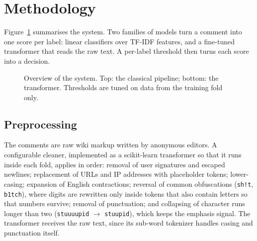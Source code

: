 \documentclass[11pt,a4paper]{article}
\begin{document}
\section{Methodology}

Figure~\ref{fig:pipeline} summarises the system.  Two families of models turn
a comment into one score per label: linear classifiers over TF-IDF features,
and a fine-tuned transformer that reads the raw text.  A per-label threshold
then turns each score into a decision.

\begin{figure}[H]
  \centering
  \caption{Overview of the system.  Top: the classical pipeline; bottom: the
    transformer.  Thresholds are tuned on data from the training fold only.}
  \label{fig:pipeline}
\end{figure}

\subsection{Preprocessing}

The comments are raw wiki markup written by anonymous editors.  A configurable
cleaner, implemented as a scikit-learn transformer so that it runs inside each
fold, applies in order: removal of user signatures and escaped newlines;
replacement of URLs and IP addresses with placeholder tokens; lower-casing;
expansion of English contractions; reversal of common obfuscations
(\texttt{sh!t}, \texttt{b1tch}), where digits are rewritten only inside tokens
that also contain letters so that numbers survive; removal of punctuation; and
collapsing of character runs longer than two (\texttt{stuuuupid} $\to$
\texttt{stuupid}), which keeps the emphasis signal.  The transformer receives
the raw text, since its sub-word tokenizer handles casing and punctuation
itself.
\end{document}
